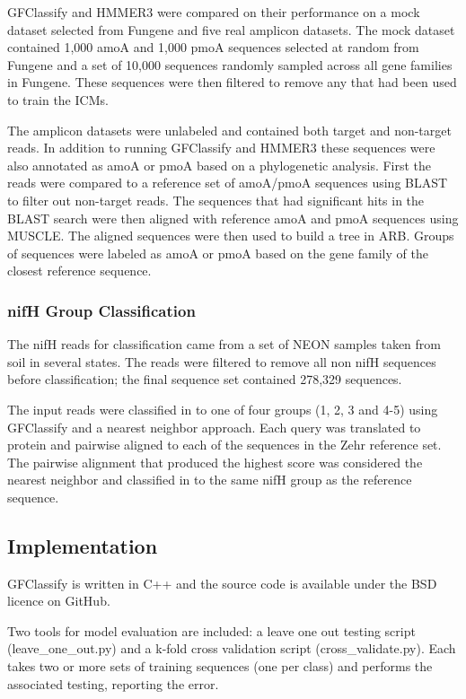 \documentclass{article}
\begin{document}
GFClassify and HMMER3 were compared on their performance on a mock dataset selected from Fungene and five real amplicon datasets. The mock dataset contained 1,000 amoA and 1,000 pmoA sequences selected at random from Fungene and a set of 10,000 sequences randomly sampled across all gene families in Fungene.  These sequences were then filtered to remove any that had been used to train the ICMs. 

The amplicon datasets were unlabeled and contained both target and non-target reads. In addition to running GFClassify and HMMER3 these sequences were also annotated as amoA or pmoA based on a phylogenetic analysis. First the reads were compared to a reference set of amoA/pmoA sequences using BLAST\cite{blast} to filter out non-target reads.  The sequences that had significant hits in the BLAST search were then aligned with reference amoA and pmoA sequences using MUSCLE.  The aligned sequences were then used to build a tree in ARB\cite{ARB}.  Groups of sequences were labeled as amoA or pmoA based on the gene family of the closest reference sequence.

\subsubsection{nifH Group Classification}
The nifH reads for classification came from a set of NEON samples taken from soil in several states. The reads were filtered to remove all non nifH sequences before classification; the final sequence set contained 278,329 sequences.

The input reads were classified in to one of four groups (1, 2, 3 and 4-5) using GFClassify and a nearest neighbor approach.  Each query was translated to protein and pairwise aligned to each of the sequences in the Zehr reference set.  The pairwise alignment that produced the highest score was considered the nearest neighbor and classified in to the same nifH group as the reference sequence.

\subsection{Implementation}
GFClassify is written in C++ and the source code is available under the BSD licence on GitHub.

Two tools for model evaluation are included: a leave one out testing script (leave\_one\_out.py) and a k-fold cross validation script (cross\_validate.py).  Each takes two or more sets of training sequences (one per class) and performs the associated testing, reporting the error.
\end{document}

